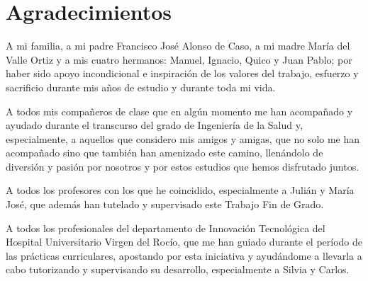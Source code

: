 \chapter*{Agradecimientos}

A mi familia, a mi padre Francisco José Alonso de Caso, a mi madre María del Valle Ortiz y a mis cuatro hermanos: Manuel, Ignacio, Quico y Juan Pablo; por haber sido apoyo incondicional e inspiración de los valores del trabajo, esfuerzo y sacrificio durante mis años de estudio y durante toda mi vida.

A todos mis compañeros de clase que en algún momento me han acompañado y ayudado durante el transcurso del grado de Ingeniería de la Salud y, especialmente, a aquellos que considero mis amigos y amigas, que no solo me han acompañado sino que también han amenizado este camino, llenándolo de diversión y pasión por nosotros y por estos estudios que hemos disfrutado juntos.

A todos los profesores con los que he coincidido, especialmente a Julián y María José, que además han tutelado y supervisado este Trabajo Fin de Grado.

A todos los profesionales del departamento de Innovación Tecnológica del Hospital Universitario Virgen del Rocío, que me han guiado durante el período de las prácticas curriculares, apostando por esta iniciativa y ayudándome a llevarla a cabo tutorizando y supervisando su desarrollo, especialmente a Silvia y Carlos.
